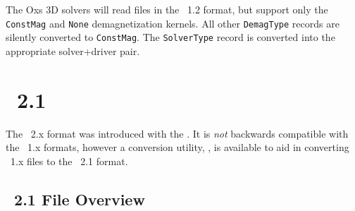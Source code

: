The Oxs 3D solvers will read files in the \MIF~1.2 format, but support
only the \texttt{ConstMag} and \texttt{None} demagnetization kernels.
All other \texttt{DemagType} records are silently converted
to \texttt{ConstMag}.  The \texttt{SolverType} record is converted into
the appropriate solver+driver pair.

\section{\MIF\ 2.1}\label{sec:mif2format}
The \MIF~2.x format was introduced with the
.
It is \textit{not} backwards compatible with the \MIF~1.x formats,
however a conversion utility,
, is available
to aid in converting \MIF~1.x files to the \MIF~2.1 format.

\subsection{\MIF\ 2.1 File Overview}%
\label{sec:mif2overview}

